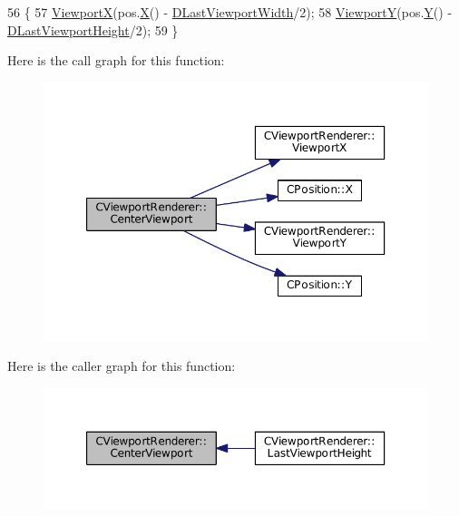 \begin{DoxyCode}
56                                                           \{
57     \hyperlink{classCViewportRenderer_adf6c09ee00cdbf0803e72d59bff9a235}{ViewportX}(pos.\hyperlink{classCPosition_a9a6b94d3b91df1492d166d9964c865fc}{X}() - \hyperlink{classCViewportRenderer_aaa21acd1b43badc3c1a3b0bf9b0f86f9}{DLastViewportWidth}/2);
58     \hyperlink{classCViewportRenderer_add3d4da286927abe2f19fbb37fd42ed5}{ViewportY}(pos.\hyperlink{classCPosition_a1aa8a30e2f08dda1f797736ba8c13a87}{Y}() - \hyperlink{classCViewportRenderer_aaca5c330615fc2aacc57dede8e7c18b0}{DLastViewportHeight}/2);
59 \}
\end{DoxyCode}
Here is the call graph for this function\+:
\nopagebreak
\begin{figure}[H]
\begin{center}
\leavevmode
\includegraphics[width=350pt]{classCViewportRenderer_a12842df851be0f115a735cec994d863e_cgraph}
\end{center}
\end{figure}
Here is the caller graph for this function\+:
\nopagebreak
\begin{figure}[H]
\begin{center}
\leavevmode
\includegraphics[width=350pt]{classCViewportRenderer_a12842df851be0f115a735cec994d863e_icgraph}
\end{center}
\end{figure}
\hypertarget{classCViewportRenderer_a2c23b54725686c6219c8765e48351d72}{}\label{classCViewportRenderer_a2c23b54725686c6219c8765e48351d72} 
